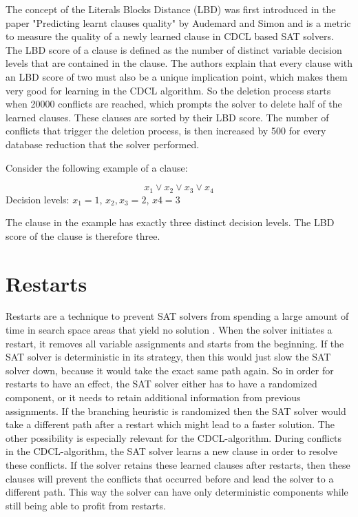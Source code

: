 The concept of the Literals Blocks Distance (LBD) was first introduced in the paper "Predicting learnt clauses quality" \cite{audemard2009predicting} by Audemard and Simon and is a metric to measure the quality of a newly learned clause in CDCL based SAT solvers. The LBD score of a clause is defined as the number of distinct variable decision levels that are contained in the clause. The authors explain that every clause with an LBD score of two must also be a unique implication point, which makes them very good for learning in the CDCL algorithm. So the deletion process starts when 20000 conflicts are reached, which prompts the solver to delete half of the learned clauses. These clauses are sorted by their LBD score. The number of conflicts that trigger the deletion process, is then increased by 500 for every database reduction that the solver performed.

Consider the following example of a clause:

\begin{leftbar}
\begin{center}
\begin{displaymath}
x_1 \vee x_2 \vee x_3 \vee x_4
\end{displaymath}
Decision levels: $x_1=1$, $x_2,x_3=2$, $x4=3$ 
\end{center}
\end{leftbar}

The clause in the example has exactly three distinct decision levels. The LBD score of the clause is therefore three.

\section{Restarts}

Restarts are a technique to prevent SAT solvers from spending a large amount of time in search space areas that yield no solution \cite{biere2009handbook}. When the solver initiates a restart, it removes all variable assignments and starts from the beginning. If the SAT solver is deterministic in its strategy, then this would just slow the SAT solver down, because it would take the exact same path again. So in order for restarts to have an effect, the SAT solver either has to have a randomized component, or it needs to retain additional information from previous assignments. If the branching heuristic is randomized then the SAT solver would take a different path after a restart which might lead to a faster solution. The other possibility is especially relevant for the CDCL-algorithm. During conflicts in the CDCL-algorithm, the SAT solver learns a new clause in order to resolve these conflicts. If the solver retains these learned clauses after restarts, then these clauses will prevent the conflicts that occurred before and lead the solver to a different path. This way the solver can have only deterministic components while still being able to profit from restarts.

